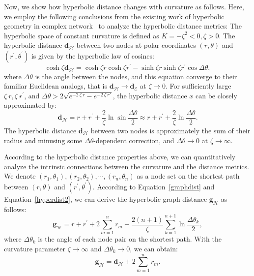 Now, we show how hyperbolic distance changes with curvature as follows. 
Here, we employ the following conclusions from the existing work of hyperbolic geometry in complex network~\cite{Krioukov2010Hyperbolic} to analyze the hyperbolic distance metrics: 
The hyperbolic space of constant curvature is defined as $K = -{\zeta}^2 < 0, \zeta > 0$. 
The hyperbolic distance $\mathbf{d}_{\mathcal{H}}$ between two nodes at polar coordinates $(r, \theta)$ and $(r^{\prime}, \theta^{\prime})$ is given by the hyperbolic law of cosines:
\begin{equation}\label{hyperdist1}
   \cosh \zeta \mathbf{d}_{\mathcal{H}}=\cosh \zeta r \cosh \zeta r^{\prime}-\sinh \zeta r \sinh \zeta r^{\prime} \cos \Delta \theta,
\end{equation}
where $\Delta\theta$ is the angle between the nodes, and this equation converge to their familiar Euclidean analogs, that is $\mathbf{d}_{\mathcal{H}} \rightarrow \mathbf{d}_{\mathcal{E}}$ at $\zeta \rightarrow 0$. 
For sufficiently large $\zeta~r, \zeta~r^{\prime}$, and $\Delta\theta > 2\sqrt{e^{-2~\zeta~r}-e^{-2~\zeta~r'}}$, the hyperbolic distance $x$ can be closely approximated by: 
\begin{equation}\label{hyperdist2}
   \mathbf{d}_{\mathcal{H}}=r+r^{\prime}+\frac{2}{\zeta} \ln \sin \frac{\Delta \theta}{2} \approx r+r^{\prime}+\frac{2}{\zeta} \ln \frac{\Delta \theta}{2}.
\end{equation}
The hyperbolic distance $\mathbf{d}_{\mathcal{H}}$ between two nodes is approximately the sum of their radius and minusing some $\Delta\theta$-dependent correction, and $\Delta\theta \rightarrow 0$ at $\zeta \rightarrow \infty$. 

According to the hyperbolic distance properties above, we can quantitatively analyze the intrinsic connections between the curvature and the distance metrics. 
We denote $(r_1, \theta_1),(r_2, \theta_2),\cdots,(r_n, \theta_n)$ as a node set on the shortest path between $(r, \theta)$ and $(r^{\prime}, \theta^{\prime})$. 
According to Equation~\eqref{graphdist} and Equation~\eqref{hyperdist2}, we can derive the hyperbolic graph distance $\mathbf{g}_{\mathcal{H}}$ as follows:
\begin{equation}\label{hypergraphdist}
   \mathbf{g}_{\mathcal{H}}= r + r^{\prime} + 2\sum_{m=1}^{n}r_m + \frac{2(n+1)}{\zeta}\sum_{k=1}^{n+1}\ln \frac{\Delta \theta_k}{2},
\end{equation}
where $\Delta \theta_k$ is the angle of each node pair on the shortest path. 
With the curvature parameter $\zeta \rightarrow \infty$ and $\Delta \theta_k \rightarrow 0$, we can obtain:
\begin{equation}\label{hypergraphdist2}
   \mathbf{g}_{\mathcal{H}}= \mathbf{d}_{\mathcal{H}} + 2\sum_{m=1}^{n}r_m.
\end{equation}

